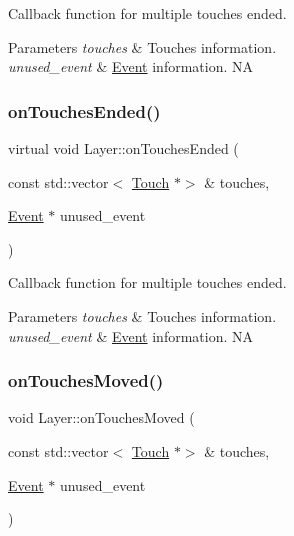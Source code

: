 Callback function for multiple touches ended.


\begin{DoxyParams}{Parameters}
{\em touches} & Touches information. \\
\hline
{\em unused\+\_\+event} & \hyperlink{classEvent}{Event} information.  NA \\
\hline
\end{DoxyParams}
\mbox{\label{classLayer_a5bcef7ed687630bfd02e0de57f066c6f}} 
\subsubsection{\texorpdfstring{on\+Touches\+Ended()}{onTouchesEnded()}\hspace{0.1cm}{\footnotesize\ttfamily [2/2]}}
{\footnotesize\ttfamily virtual void Layer\+::on\+Touches\+Ended (\begin{DoxyParamCaption}\item[{const std\+::vector$<$ \hyperlink{classTouch}{Touch} $\ast$$>$ \&}]{touches,  }\item[{\hyperlink{classEvent}{Event} $\ast$}]{unused\+\_\+event }\end{DoxyParamCaption})\hspace{0.3cm}{\ttfamily [virtual]}}

Callback function for multiple touches ended.


\begin{DoxyParams}{Parameters}
{\em touches} & Touches information. \\
\hline
{\em unused\+\_\+event} & \hyperlink{classEvent}{Event} information.  NA \\
\hline
\end{DoxyParams}
\mbox{\label{classLayer_af1c25a5eb91f619ca30b130c59f8ccbd}} 
\subsubsection{\texorpdfstring{on\+Touches\+Moved()}{onTouchesMoved()}\hspace{0.1cm}{\footnotesize\ttfamily [1/2]}}
{\footnotesize\ttfamily void Layer\+::on\+Touches\+Moved (\begin{DoxyParamCaption}\item[{const std\+::vector$<$ \hyperlink{classTouch}{Touch} $\ast$$>$ \&}]{touches,  }\item[{\hyperlink{classEvent}{Event} $\ast$}]{unused\+\_\+event }\end{DoxyParamCaption})\hspace{0.3cm}{\ttfamily [virtual]}}

